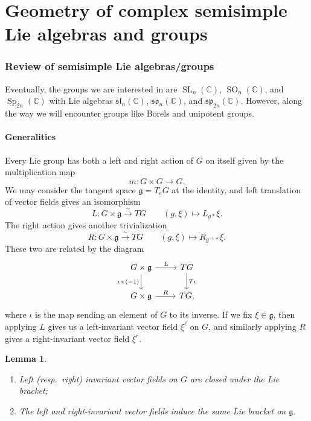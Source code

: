 \documentclass{amsart}
\newtheorem{lem}[thm]{Lemma}
\theoremstyle{definition}
\theoremstyle{remark}
\theoremstyle{plain}
\theoremstyle{definition}
\theoremstyle{remark}
\newcommand{\C}{\mathbb{C}}
\newcommand{\g}{\mathfrak{g}}
\newcommand{\mf}[1]{\mathfrak{#1}}
\newcommand{\on}[1]{\operatorname{#1}}
\newcommand{\1}{\mathbf{1}}
\newcommand{\2}{\mathbf{2}}
\newcommand{\3}{\mathbf{3}}
\newcommand{\so}{\mf{so}}
\renewcommand{\sp}{\mf{sp}}
\begin{document}
\part{Geometry of complex semisimple Lie algebras and groups}

\section{Review of semisimple Lie algebras/groups}%
\label{sec:Review of semisimple Lie algebras/groups}

Eventually, the groups we are interested in are \(\on{SL}_n(\C)\), \(\on{SO}_n(\C)\), and \(\on{Sp}_{2n}(\C)\) with Lie algebras \(\mf{sl}_n(\C)\), \(\so_n(\C)\), and \(\sp_{2n}(\C)\). However, along the way we will encounter groups like Borels and unipotent groups.

\subsection{Generalities}%
\label{sub:Generalities}


Every Lie group has both a left and right action of \(G\) on itself given by the multiplication map
\[ m \colon G \times G \to G. \]
We may consider the tangent space \(\g = T_e G\) at the identity, and left translation of vector fields gives an isomorphism
\[ L \colon G \times \g \xrightarrow{\sim} TG \qquad (g, \xi) \mapsto L_{g *} \xi. \]
The right action gives another trivialization
\[ R \colon G \times \g \xrightarrow{\sim} TG \qquad (g, \xi) \mapsto R_{g^{-1} *} \xi. \]
These two are related by the diagram
\begin{equation*}
\begin{tikzcd}
    G \times \g \ar{r}{L} \ar[swap]{d}{\iota \times (-1)} & TG \ar{d}{T\iota} \\
    G \times \g \ar{r}{R} & TG,
\end{tikzcd}
\end{equation*}
where \(\iota\) is the map sending an element of \(G\) to its inverse. If we fix \(\xi \in \g\), then applying \(L\) gives us a left-invariant vector field \(\xi^{\ell}\) on \(G\), and similarly applying \(R\) gives a right-invariant vector field \(\xi^r\). 

\begin{lem}\leavevmode
    \begin{enumerate}
        \item Left (resp.\ right) invariant vector fields on \(G\) are closed under the Lie bracket;
        \item The left and right-invariant vector fields induce the same Lie bracket on \(\g\).
    \end{enumerate}
\end{lem}
\end{document}
